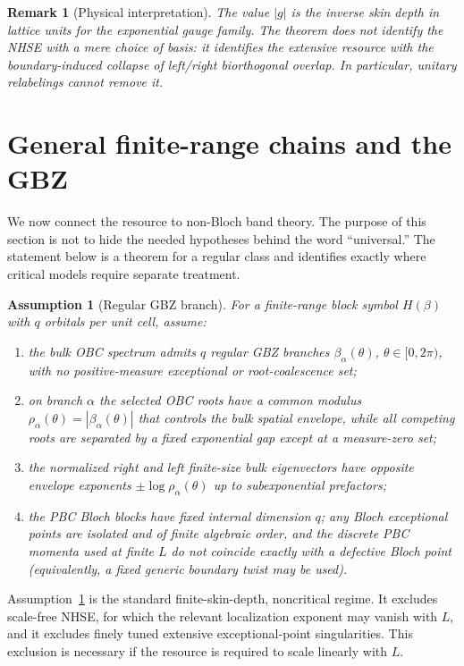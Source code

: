 \documentclass[reprint,amsmath,amssymb,aps,nofootinbib]{revtex4-2}
\newtheorem{remark}{Remark}
\newtheorem{assumption}{Assumption}
\begin{document}
\begin{remark}[Physical interpretation]
The value $|g|$ is the inverse skin depth in lattice units for the
exponential gauge family. The theorem does not identify the NHSE with a
mere choice of basis: it identifies the extensive resource with the
boundary-induced collapse of left/right biorthogonal overlap. In particular,
unitary relabelings cannot remove it.
\end{remark}

\section{General finite-range chains and the GBZ}
\label{sec:GBZ}

We now connect the resource to non-Bloch band theory. The purpose of this
section is not to hide the needed hypotheses behind the word ``universal.''
The statement below is a theorem for a regular class and identifies exactly
where critical models require separate treatment.

\begin{assumption}[Regular GBZ branch]
\label{ass:GBZ}
For a finite-range block symbol $H(\beta)$ with $q$ orbitals per unit cell,
assume:
\begin{enumerate}
\item the bulk OBC spectrum admits $q$ regular GBZ branches
$\beta_\alpha(\theta)$, $\theta\in[0,2\pi)$, with no positive-measure
exceptional or root-coalescence set;
\item on branch $\alpha$ the selected OBC roots have a common modulus
$\rho_\alpha(\theta)=|\beta_\alpha(\theta)|$ that controls the bulk spatial
envelope, while all competing roots are separated by a fixed exponential
gap except at a measure-zero set;
\item the normalized right and left finite-size bulk eigenvectors have
opposite envelope exponents
$\pm\log\rho_\alpha(\theta)$ up to subexponential prefactors;
\item the PBC Bloch blocks have fixed internal dimension $q$; any Bloch
exceptional points are isolated and of finite algebraic order, and the
discrete PBC momenta used at finite $L$ do not coincide exactly with a
defective Bloch point (equivalently, a fixed generic boundary twist may be
used).
\end{enumerate}
\end{assumption}

Assumption~\ref{ass:GBZ} is the standard finite-skin-depth, noncritical regime.
It excludes scale-free NHSE, for which the relevant localization exponent may
vanish with $L$, and it excludes finely tuned extensive exceptional-point
singularities. This exclusion is necessary if the resource is required to
scale linearly with $L$.
\end{document}
